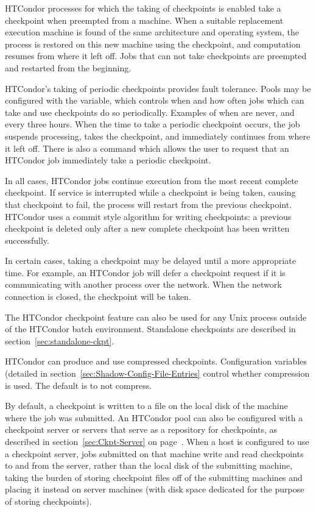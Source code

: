 HTCondor processes for which the taking of checkpoints is enabled 
take a checkpoint when preempted from a machine.
When a suitable replacement
execution machine is found of the same architecture and operating
system, the process is restored on this new machine using the
checkpoint, and computation resumes from where it left off.  
Jobs that can not take checkpoints are preempted and restarted from the
beginning.

HTCondor's taking of periodic checkpoints provides fault tolerance.
Pools may be configured with the  variable,
which controls when and how often jobs which can take and use
checkpoints do so periodically.
Examples of when are never, and every three hours.
When the time to take a periodic checkpoint occurs, the job
suspends processing, takes the checkpoint, and immediately
continues from where it left off.  There is also a  command
which allows the user to request that an HTCondor job immediately take
a periodic checkpoint.

In all cases, HTCondor jobs continue execution from the most recent
complete checkpoint.  If service is interrupted while a checkpoint is
being taken, causing that checkpoint to fail, the process will
restart from the previous checkpoint.  HTCondor uses a commit style
algorithm for writing checkpoints: a previous checkpoint is deleted
only after a new complete checkpoint has been written successfully.

In certain cases, taking a checkpoint may be delayed until a more appropriate
time.  For example, an HTCondor job will defer a checkpoint request if
it is communicating with another process over the network.  When the
network connection is closed, the checkpoint will be taken.

The HTCondor checkpoint feature can also be used for any Unix process
outside of the HTCondor batch environment. Standalone checkpoints
are described in section~\ref{sec:standalone-ckpt}.

HTCondor can produce and use compressed checkpoints.
Configuration variables (detailed in 
section~\ref{sec:Shadow-Config-File-Entries}
control whether compression is used.
The default is to not compress.

By default, a checkpoint is written to a file on the local disk of the
machine where the job was submitted.  An HTCondor pool can also be
configured with a checkpoint server or servers that
serve as a repository for checkpoints, as described in
section~\ref{sec:Ckpt-Server} on page~\pageref{sec:Ckpt-Server}.
When a host is configured to use a checkpoint server, jobs submitted
on that machine write and read checkpoints to and from the server,
rather than the local disk of the submitting machine, taking the
burden of storing checkpoint files off of the submitting machines and
placing it instead on server machines (with disk space dedicated for
the purpose of storing checkpoints).

